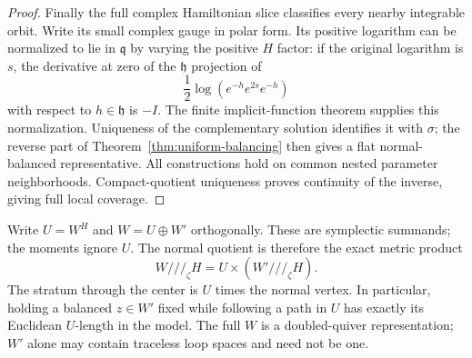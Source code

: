 \begin{proof}
Finally the full complex Hamiltonian slice classifies every nearby
integrable orbit. Write its small complex gauge in polar form. Its
positive logarithm can be normalized to lie in $\mathfrak q$ by
varying the positive $H$ factor: if the original logarithm is $s$,
the derivative at zero of the $\mathfrak h$ projection of
\[
 \frac12\log(e^{-h}e^{2s}e^{-h})
\]
with respect to $h\in\mathfrak h$ is $-I$.
The finite implicit-function theorem supplies this normalization.
Uniqueness of the complementary solution identifies it with $\sigma$;
the reverse part of Theorem~\ref{thm:uniform-balancing} then gives a
flat normal-balanced representative. All constructions hold on common
nested parameter neighborhoods. Compact-quotient uniqueness proves
continuity of the inverse, giving full local coverage.
\end{proof}

Write $U=W^H$ and $W=U\oplus W'$ orthogonally. These are symplectic
summands; the moments ignore $U$. The normal quotient is therefore
the exact metric product
\begin{equation}\label{eq:normal-product}
 W///_\zeta H=U\times(W'///_\zeta H).
\end{equation}
The stratum through the center is $U$ times the normal vertex.
In particular, holding a balanced $z\in W'$ fixed while following a
path in $U$ has exactly its Euclidean $U$-length in the model.
The full $W$ is a doubled-quiver representation; $W'$ alone may
contain traceless loop spaces and need not be one.

